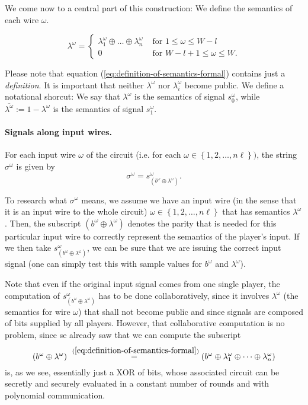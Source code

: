 \message{ !name(seminar.tex)}\documentclass{llncs}
\begin{document}
We come now to a central part of this construction: We define the semantics of each wire $\omega$.

\begin{equation}
  \label{eq:definition-of-semantics-formal}
  \lambda^\omega= 
  \begin{cases}
    \lambda_{1}^\omega\oplus\dots\oplus\lambda_{n}^\omega & \text{ for } 1\leq\omega\leq W-l \\
    0 & \text{ for } W-l+1\leq\omega\leq W.
  \end{cases}
\end{equation}

Please note that equation (\ref{eq:definition-of-semantics-formal}) contains just a \emph{definition}. It is important that neither $\lambda^\omega$ nor $\lambda_i^\omega$ become public. We define a notational shorcut: We say that $\lambda^\omega$ is the semantics of signal $s_0^\omega$, while $\overline{\lambda^\omega}:=1-\lambda^\omega$ is the semantics of signal $s_1^\omega$.

\paragraph{Signals along input wires.}

For each input wire $\omega$ of the circuit (i.e. for each $\omega \in \left\{ 1,2,\dots,n\ell\right\})$, the string $\sigma^\omega$ is given by
  \begin{equation}
    \label{eq:sigma-superscript-omega-definition}
    \sigma^\omega=s_{(b^\omega\oplus\lambda^\omega)}^\omega.
  \end{equation}

To research what $\sigma^\omega$ means, we assume we have an input wire (in the sense that it is an input wire to the whole circuit) $\omega\in\left\{ 1,2,\dots,n\ell \right\}$ that has semantics $\lambda^\omega$. Then, the subscript $(b^\omega\oplus\lambda^\omega)$ denotes the parity that is needed for this particular input wire to correctly represent the semantics of the player's input. If we then take $s_{(b^\omega\oplus\lambda^\omega)}^\omega$, we can be sure that we are issuing the correct input signal (one can simply test this with sample values for $b^\omega$ and $\lambda^\omega$).

Note that even if the original input signal comes from one single player, the computation of $s_{(b^\omega\oplus\lambda^\omega)}^\omega$ has to be done collaboratively, since it involves $\lambda^\omega$ (the semantics for wire $\omega$) that shall not become public and since signals are composed of bits supplied by all players. However, that collaborative computation is no problem, since se already saw that we can compute the subscript
\begin{equation}
\label{eq:computing-input-signals}
(b^\omega\oplus\lambda^\omega)\stackrel{~(\ref{eq:definition-of-semantics-formal})}{=}(b^\omega\oplus\lambda_{1}^\omega\oplus\dots\oplus\lambda_{n}^\omega)
\end{equation}
is, as we see, essentially just a XOR of bits, whose associated circuit can be secretly and securely evaluated in a constant number of rounds and with polynomial communication.
\end{document}
